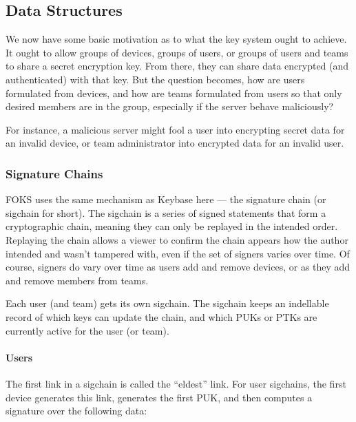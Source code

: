 \subsection{Data Structures}

We now have some basic motivation as to what the key system ought to achieve.
It ought to allow groups of devices, groups of users, or groups of users
and teams to share a secret encryption key. From there, they can share data
encrypted (and authenticated) with that key. But the question becomes,
how are users formulated from devices, and how are teams formulated from users
so that only desired members are in the group, especially if the server
behave maliciously?

For instance, a malicious server might fool a user into encrypting secret data
for an invalid device, or team administrator into encrypted data for an invalid
user.

\subsubsection{Signature Chains}

FOKS uses the same mechanism as Keybase here --- the signature chain (or sigchain for short).
The sigchain is a series of signed statements that form a cryptographic chain, meaning they
can only be replayed in the intended order. Replaying the chain allows a viewer to
confirm the chain appears how the author intended and wasn't tampered with, even if
the set of signers varies over time. Of course, signers do vary over time as
users add and remove devices, or as they add and remove members from teams.

Each user (and team) gets its own sigchain. The sigchain keeps an indellable record
of which keys can update the chain, and which PUKs or PTKs are currently
active for the user (or team).

\paragraph{Users} The first link in a sigchain is called the ``eldest'' link. For user sigchains,
the first device generates this link, generates the first PUK, and then computes
a signature over the following data:


